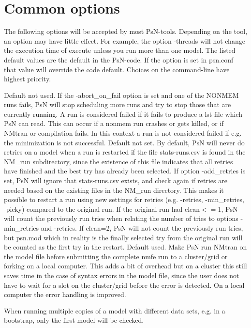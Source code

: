 \section{Common options}
The following options will be accepted by most PsN-tools. Depending on the tool, an option may have little effect. For example, the option -threads will not change the execution time of execute unless you run more than one model. The listed default values are the default in the PsN-code. If the option is set in psn.conf that value will override the code default. Choices on the command-line have highest priority.
\begin{optionlist}
Default not used. If the -abort\_on\_fail option is set and one of the NONMEM runs fails, PsN will stop scheduling more runs and try to stop those that are currently running. A run is considered failed if it fails to produce a lst file which PsN can read. This can occur if a nonmem run crashes or gets killed, or if NMtran or compilation fails. 
In this context a run is not considered failed if e.g. the minimization is not successful.  
\nextopt
{}
Default not set. By default, PsN will never do retries on a model when a run is restarted if the file stats-runs.csv is found in the NM\_run subdirectory, since the existence of this file indicates that all retries have finished and the best try has already been selected. If option -add\_retries is set, PsN will ignore that stats-runs.csv exists, and check again if retries are needed based on the existing files in the NM\_run directory. This makes it possible to restart a run using new settings for retries (e.g. -retries, -min\_retries, -picky) compared to the original run. If the original run had clean$<=1$, PsN will count the previously run tries when relating the number of tries to options -min\_retries and -retries. If clean=2, PsN will not count the previously run tries, but psn.mod which in reality is the finally selected try from the original run will be counted as the first try in the restart.  
\nextopt
{}
Default used. Make PsN run NMtran on the model file before submitting the complete nmfe run to a cluster/grid or forking on a local computer. This adds a bit of overhead but on a cluster this still saves time in the case of syntax errors in the model file, since the user does not have to wait for a slot on the cluster/grid before the error is detected. On a local computer the error handling is improved.

When running multiple copies of a model with different data sets, e.g. in a bootstrap, only the first model will be checked. 


\end{optionlist}
